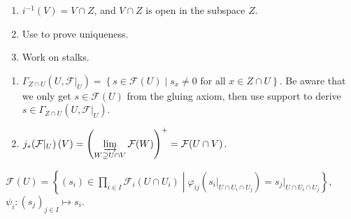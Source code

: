 \begin{exercise}\label{ex1.19}
	\begin{enumerate}[label=(\alph*),ref=\theexercise(\alph*)]
		\item\label{ex1.19.1} $i^{-1}(V)=V\cap Z$, and $V\cap Z$ is open in the subspace $Z$.
		\item\label{ex1.19.2} Use  to prove uniqueness.
		\item\label{ex1.19.3} Work on stalks.
	\end{enumerate}
\end{exercise}

\begin{exercise}\label{ex1.20}
	\begin{enumerate}[label=(\alph*),ref=\theexercise(\alph*)]
		\item\label{ex1.20.1} $\Gamma_{Z\cap U}(U,\mathcal{F}|_U)=\left\{s\in\mathcal{F}(U)\middle|s_x\neq0\text{ for all }x\in Z\cap U\right\}$. Be aware that we only get $s\in \mathcal{F}(U)$ from the gluing axiom, then use support to derive $s\in\Gamma_{Z\cap U}(U,\mathcal{F}|_U)$.
		\item\label{ex1.20.2} $\displaystyle j_*\!\left(\mathcal{F}|_U\right)(V)=\left(\varinjlim_{W\supseteq U\cap V}\mathcal{F}(W)\right)^+=\mathcal{F}(U\cap V)$.
	\end{enumerate}
\end{exercise}

\begin{exercise}\label{ex1.21}
	
\end{exercise}

\begin{exercise}\label{ex1.22}
	$\mathcal{F}(U)=\left\{\left(s_i\right)\in\prod_{i\in I}\mathcal{F}_i\!\left(U\cap U_i\right)\middle|\varphi_{ij}\!\left(s_i|_{U\cap U_i\cap U_j}\right)=s_j|_{U\cap U_i\cap U_j}\right\}$, $\psi_i:\left(s_j\right)_{j\in I}\mapsto s_i$.
\end{exercise}
